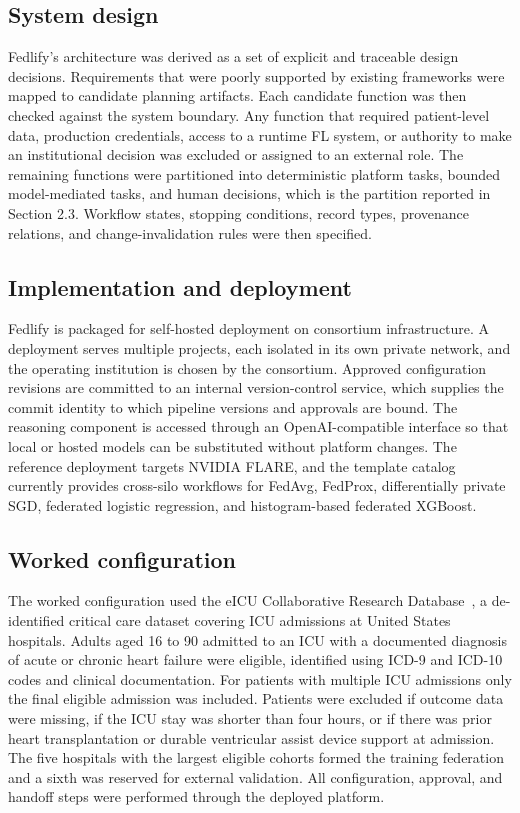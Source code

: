 \documentclass[preprint,5p, 10pt, times]{elsarticle}
\begin{document}
\subsection*{System design}

Fedlify’s architecture was derived as a set of explicit and traceable design decisions\cite{jansen2005software}.
%
Requirements that were poorly supported by existing frameworks were mapped to candidate planning artifacts. Each candidate function was then checked against the system boundary. Any function that required patient-level data, production credentials, access to a runtime FL system, or authority to make an institutional decision was excluded or assigned to an external role.
%
The remaining functions were partitioned into deterministic platform tasks, bounded model-mediated tasks, and human decisions, which is the partition reported in Section 2.3.
%
Workflow states, stopping conditions, record types, provenance relations, and change-invalidation rules were then specified.

\subsection*{Implementation and deployment}

Fedlify is packaged for self-hosted deployment on consortium infrastructure. A deployment serves multiple projects, each isolated in its own private network, and the operating institution is chosen by the consortium.
%
Approved configuration revisions are committed to an internal version-control service, which supplies the commit identity to which pipeline versions and approvals are bound.
%
The reasoning component is accessed through an OpenAI-compatible interface so that local or hosted models can be substituted without platform changes.
%
The reference deployment targets NVIDIA FLARE, and the template catalog currently provides cross-silo workflows for FedAvg, FedProx, differentially private SGD, federated logistic regression, and histogram-based federated XGBoost.

\subsection*{Worked configuration}
The worked configuration used the eICU Collaborative Research Database~\cite{PhysioNet-eicu-crd-2.0}, a de-identified critical care dataset covering ICU admissions at United States hospitals. Adults aged 16 to 90 admitted to an ICU with a documented diagnosis of acute or chronic heart failure were eligible, identified using ICD-9 and ICD-10 codes and clinical documentation.
For patients with multiple ICU admissions only the final eligible admission was included. Patients were excluded if outcome data were missing, if the ICU stay was shorter than four hours, or if there was prior heart transplantation or durable ventricular assist device support at admission. The five hospitals with the largest eligible cohorts formed the training federation and a sixth was reserved for external validation. All configuration, approval, and handoff steps were performed through the deployed platform.
\end{document}
